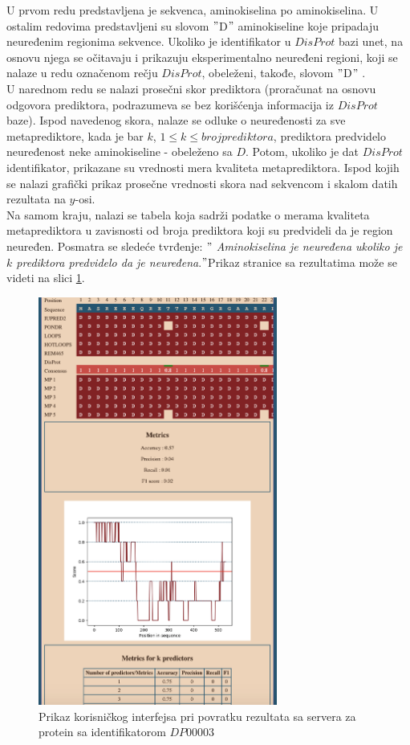 U prvom redu predstavljena je sekvenca, aminokiselina po aminokiselina. U ostalim redovima predstavljeni su slovom $"$D$"$ aminokiseline koje pripadaju neuređenim regionima sekvence. Ukoliko je identifikator u $DisProt$ bazi unet, na osnovu njega se očitavaju i prikazuju eksperimentalno neuređeni regioni, koji se nalaze u redu označenom rečju $DisProt$, obeleženi, takođe, slovom $"$D$"$ . \\

U narednom redu se nalazi prosečni skor prediktora (proračunat na osnovu odgovora prediktora, podrazumeva se bez korišćenja informacija iz $DisProt$ baze). Ispod navedenog skora, nalaze se odluke o neuređenosti za sve metaprediktore, kada je bar $k$, $1 \leq k \leq brojprediktora$, prediktora predvidelo neuređenost neke aminokiseline - obeleženo sa $D$. Potom, ukoliko je dat $DisProt$ identifikator, prikazane su vrednosti mera kvaliteta metaprediktora. Ispod kojih se nalazi grafički prikaz prosečne vrednosti skora nad sekvencom i skalom datih rezultata na $y$-osi. \\ 

Na samom kraju, nalazi se tabela koja sadrži podatke o merama kvaliteta metaprediktora u zavisnosti od broja prediktora koji su predvideli da je region neuređen. Posmatra se sledeće tvrđenje: $"$ \textit{Aminokiselina je neuređena ukoliko je $k$ prediktora predvidelo da je neuređena}.$"$Prikaz stranice sa rezultatima može se videti na slici \ref{fig:rezultati}.
\begin{figure}[H]
	\centering
    \includegraphics[width=0.7\textwidth]{Figures/App/rezultati.png}
    \caption{Prikaz korisničkog interfejsa pri povratku rezultata sa servera za protein sa identifikatorom $DP00003$}
    \label{fig:rezultati}
\end{figure}

